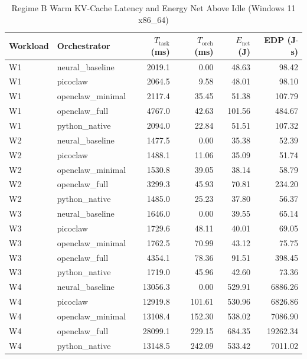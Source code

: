 \begin{table}[t]
\centering\small
\caption{Regime B Warm KV-Cache Latency and Energy Net Above Idle (Windows 11 x86_64)}
\label{tab:Windows_warm_cache}
\begin{tabular}{llrrrr}
\toprule
Workload & Orchestrator & $T_{\text{task}}$ (ms) & $T_{\text{orch}}$ (ms) & $E_{\text{net}}$ (J) & EDP (J$\cdot$s) \\
\midrule
W1 & neural\_baseline & 2019.1 & 0.00 & 48.63 & 98.42 \\
W1 & picoclaw & 2064.5 & 9.58 & 48.01 & 98.10 \\
W1 & openclaw\_minimal & 2117.4 & 35.45 & 51.38 & 107.79 \\
W1 & openclaw\_full & 4767.0 & 42.63 & 101.56 & 484.67 \\
W1 & python\_native & 2094.0 & 22.84 & 51.51 & 107.32 \\
W2 & neural\_baseline & 1477.5 & 0.00 & 35.38 & 52.39 \\
W2 & picoclaw & 1488.1 & 11.06 & 35.09 & 51.74 \\
W2 & openclaw\_minimal & 1530.8 & 39.05 & 38.14 & 58.79 \\
W2 & openclaw\_full & 3299.3 & 45.93 & 70.81 & 234.20 \\
W2 & python\_native & 1485.0 & 25.23 & 37.80 & 56.37 \\
W3 & neural\_baseline & 1646.0 & 0.00 & 39.55 & 65.14 \\
W3 & picoclaw & 1729.6 & 48.11 & 40.01 & 69.05 \\
W3 & openclaw\_minimal & 1762.5 & 70.99 & 43.12 & 75.75 \\
W3 & openclaw\_full & 4354.1 & 78.36 & 91.51 & 398.45 \\
W3 & python\_native & 1719.0 & 45.96 & 42.60 & 73.36 \\
W4 & neural\_baseline & 13056.3 & 0.00 & 529.91 & 6886.26 \\
W4 & picoclaw & 12919.8 & 101.61 & 530.96 & 6826.86 \\
W4 & openclaw\_minimal & 13108.4 & 152.30 & 538.02 & 7086.90 \\
W4 & openclaw\_full & 28099.1 & 229.15 & 684.35 & 19262.34 \\
W4 & python\_native & 13148.5 & 242.09 & 533.42 & 7011.02 \\
\bottomrule
\end{tabular}
\end{table}
